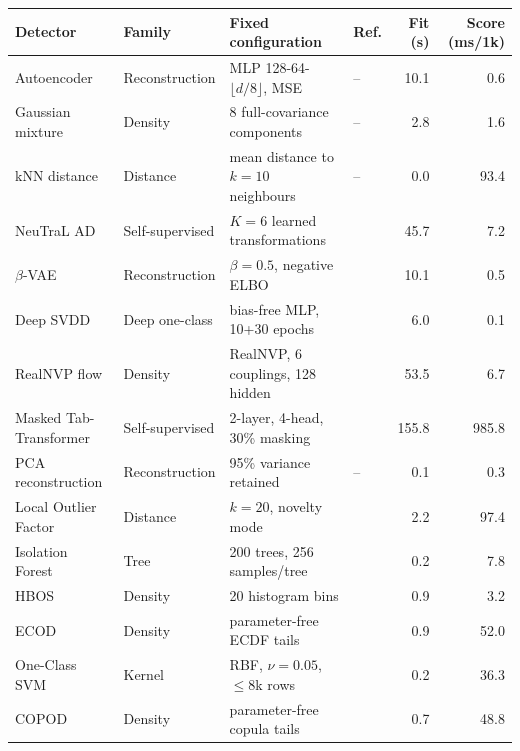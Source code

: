 \begin{tabular}{llllrr}
\toprule
Detector & Family & Fixed configuration & Ref. & Fit (s) & Score (ms/1k) \\
\midrule
Autoencoder & Reconstruction & MLP 128-64-$\lfloor d/8\rfloor$, MSE & -- & 10.1 & 0.6 \\
Gaussian mixture & Density & 8 full-covariance components & -- & 2.8 & 1.6 \\
kNN distance & Distance & mean distance to $k{=}10$ neighbours & -- & 0.0 & 93.4 \\
NeuTraL AD & Self-supervised & $K{=}6$ learned transformations & \cite{qiu2021} & 45.7 & 7.2 \\
$\beta$-VAE & Reconstruction & $\beta{=}0.5$, negative ELBO & \cite{kingma2014,higgins2017} & 10.1 & 0.5 \\
Deep SVDD & Deep one-class & bias-free MLP, 10+30 epochs & \cite{ruff2018} & 6.0 & 0.1 \\
RealNVP flow & Density & RealNVP, 6 couplings, 128 hidden & \cite{dinh2017} & 53.5 & 6.7 \\
Masked Tab-Transformer & Self-supervised & 2-layer, 4-head, 30\% masking & \cite{gorishniy2021} & 155.8 & 985.8 \\
PCA reconstruction & Reconstruction & 95\% variance retained & -- & 0.1 & 0.3 \\
Local Outlier Factor & Distance & $k{=}20$, novelty mode & \cite{breunig2000} & 2.2 & 97.4 \\
Isolation Forest & Tree & 200 trees, 256 samples/tree & \cite{liu2008} & 0.2 & 7.8 \\
HBOS & Density & 20 histogram bins & \cite{goldstein2012} & 0.9 & 3.2 \\
ECOD & Density & parameter-free ECDF tails & \cite{li2022} & 0.9 & 52.0 \\
One-Class SVM & Kernel & RBF, $\nu{=}0.05$, $\le$8k rows & \cite{scholkopf2001} & 0.2 & 36.3 \\
COPOD & Density & parameter-free copula tails & \cite{li2020} & 0.7 & 48.8 \\
\bottomrule
\end{tabular}